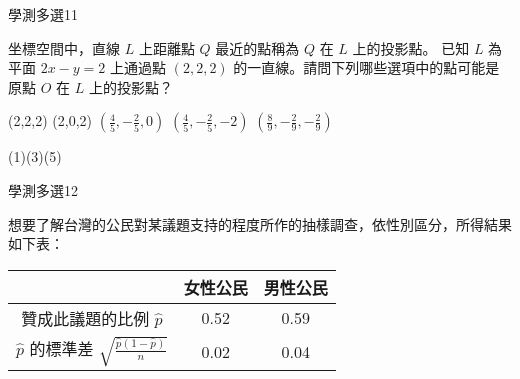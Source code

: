 \begin{QUESTIONS}
    \begin{QUESTION}
        \begin{ExamInfo}{99}{學測}{多選}{11}
        \end{ExamInfo}
        \begin{ExamAnsRateInfo}{17}{25}{16}{10}
        \end{ExamAnsRateInfo}
        \begin{QBODY}
            坐標空間中，直線 $L$ 上距離點 $Q$ 最近的點稱為 $Q$ 在 $L$ 上的投影點。 已知 $L$ 為平面 $2x-y=2$ 上通過點 $(2, 2, 2)$ 的一直線。請問下列哪些選項中的點可能是原點 $O$ 在 $L$ 上的投影點？ 
			\begin{QOPS} 
				\QOP (2,2,2) 
				\QOP (2,0,2) 
				\QOP $(\frac{4}{5},-\frac{2}{5},0)$ 
				\QOP $(\frac{4}{5},-\frac{2}{5},-2)$ 
				\QOP $(\frac{8}{9},-\frac{2}{9},-\frac{2}{9})$
			\end{QOPS}
        \end{QBODY}
        \begin{QFROMS}
        \end{QFROMS}
        \begin{QTAGS}\end{QTAGS}
        \begin{QANS}
            (1)(3)(5)
        \end{QANS}
        \begin{QSOLLIST}
        \end{QSOLLIST}
        \begin{QEMPTYSPACE}
        \end{QEMPTYSPACE}
    \end{QUESTION}
    \begin{QUESTION}
        \begin{ExamInfo}{99}{學測}{多選}{12}
        \end{ExamInfo}
        \begin{ExamAnsRateInfo}{21}{37}{16}{10}
        \end{ExamAnsRateInfo}
        \begin{QBODY}
            想要了解台灣的公民對某議題支持的程度所作的抽樣調查，依性別區分，所得結果如下表：
			\begin{center}
				\begin{tabular}{|c|c|c|}
					\hline
					& 女性公民& 男性公民 \\
					\hline
					贊成此議題的比例 $\hat{p}$ & 0.52 &  0.59 \\\hline
					$\hat{p}$ 的標準差   $\sqrt{\frac{\hat{p}(1-\hat{p})}{n}}$ &  0.02 & 0.04 \\\hline
				\end{tabular}
			\end{center}
			

\end{QBODY}
\end{QUESTION}
\end{QUESTIONS}
